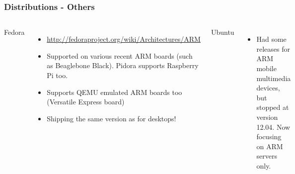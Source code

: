 \begin{frame}
  \frametitle{Distributions - Others}
  \begin{columns}[T]
    Fedora
    \begin{itemize}
    \item \url{http://fedoraproject.org/wiki/Architectures/ARM}
    \item Supported on various recent ARM boards (such as Beaglebone
      Black). Pidora supports Raspberry Pi too.
    \item Supports QEMU emulated ARM boards too (Versatile Express board)
    \item Shipping the same version as for desktops!
    \end{itemize}
    Ubuntu
    \begin{itemize}
    \item Had some releases for ARM mobile multimedia devices, but stopped
          at version 12.04. Now focusing on ARM servers only.
    \end{itemize}
    \includegraphics[width=\textwidth]{slides/sysdev-embedded-linux/fedora.png}\\
    \vspace{3.5cm}
    \includegraphics[width=\textwidth]{slides/sysdev-embedded-linux/ubuntu.png}\\
  \end{columns}
\end{frame}

